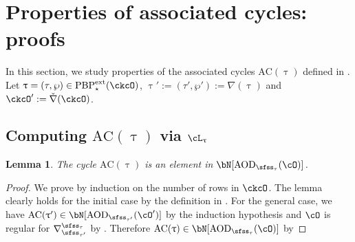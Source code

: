 \documentclass[12pt,a4paper]{amsart}
\newcommand{\AC}{\mathrm{AC}}
\def\DD{\nabla}
\numberwithin{equation}{section}
\newtheorem{lem}[thm]{Lemma}
\theoremstyle{remark}
\def\PBPes{\mathrm{PBP}^{\mathrm{ext}}_{\star}}
\def\ckcOp{\ckcO^{\prime}}
\def\uptaup{\uptau^{\prime}}
\def\ckDD{{\check\DD}}
\begin{document}
\section{Properties of associated cycles: proofs}
\label{sec:ACC}

\def\dsign{{}^d\mathrm{Sign}}

\def\acm{\cL}
\def\acme{\tilde{\cL}}
\def\dlifttso{{\check \vartheta}_{\sfss_{\tau'},\cO'}^{\sfss_{\tau},\;\cO}}
\def\DDtss{\DD_{\sfss_{\tau'}}^{\sfss_{\tau}}}
\def\taut{\tau_{\bftt}}

In this section, we study properties of the associated cycles $\AC(\uptau)$
defined in .
Let $\uptau=(\tau,\wp)\in \PBPes(\ckcO)$, $\uptau' := (\tau',\wp'):=\DD(\uptau)$ and  $\ckcOp:=\ckDD(\ckcO)$.

\subsection{Computing $\AC(\uptau)$ via $\ac_{\uptau}$}

\begin{lem}\label{lem:actau}
  The cycle $\AC(\uptau)$ is an element in $\bN[\AOD_{\sfss_\tau}(\cO)]$.
\end{lem}
\begin{proof}
We prove by induction on the number of rows in $\ckcO$. The lemma clearly holds
for the initial case by the definition in . For the general
case, we have $\AC(\uptaup)\in \bN[\AOD_{\sfss_{\tau'}}(\cO')]$ by the induction
hypothesis and $\cO$ is regular for $\DDtss$ by . Therefore
$\AC(\uptau)\in \bN[\AOD_{\sfss_\tau}(\cO)]$  by 
\end{proof}
\end{document}
